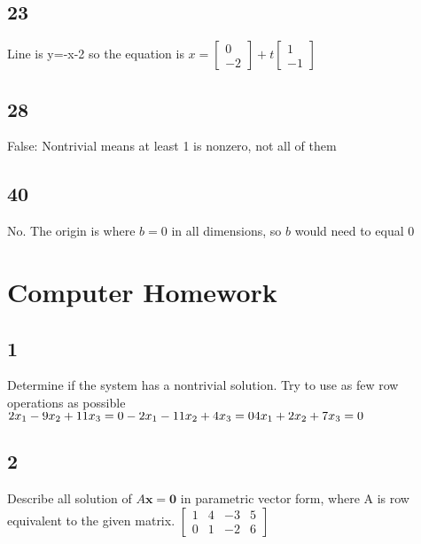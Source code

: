 \documentclass{article}
\begin{document}
\subsection*{23}
Line is y=-x-2 so the equation is $x=\begin{bmatrix}0\\-2\end{bmatrix} + t\begin{bmatrix}1 \\ -1\end{bmatrix}$
\subsection*{28}
False: Nontrivial means at least 1 is nonzero, not all of them
\subsection*{40}
No. The origin is where $b=0$ in all dimensions, so $b$ would need to equal 0

\section{Computer Homework}
\subsection*{1}
Determine if the system has a nontrivial solution. Try to use as few row operations as possible
$2x_1-9x_2+11x_3=0 \\ -2x_1-11x_2+4x_3=0\\4x_1+2x_2+7x_3=0$
\\ 
\subsection*{2}
Describe all solution of $A\mathbf{x}=\mathbf{0}$ in parametric vector form, where A is row equivalent to the given matrix.
$\begin{bmatrix}1&4&-3&5\\0&1&-2&6\end{bmatrix}$
\\ 
\end{document}
